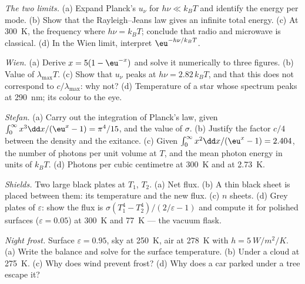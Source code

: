 \begin{exercise}[$\star\star$]\label{exo:b2:thermal-radiation:5}
\emph{The two limits.} (a) Expand Planck's $u_\nu$ for $h\nu \ll k_BT$ and
identify the energy per mode. (b) Show that the Rayleigh--Jeans law
gives an infinite total energy. (c) At \qty{300}{K}, the frequency where
$h\nu = k_BT$; conclude that radio and microwave  is
classical. (d) In the Wien limit, interpret $\eu^{-h\nu/k_BT}$.
\end{exercise}

\begin{exercise}[$\star\star$]\label{exo:b2:thermal-radiation:6}
\emph{Wien.} (a) Derive $x = 5(1 - \eu^{-x})$ and solve it numerically
to three figures. (b) Value of $\lambda_{\max}T$. (c) Show that $u_\nu$
peaks at $h\nu = 2.82\,k_BT$, and that this does not correspond to
$c/\lambda_{\max}$: why not? (d) Temperature of a star whose spectrum
peaks at \qty{290}{nm}; its colour to the eye.
\end{exercise}

\begin{exercise}[$\star\star$]\label{exo:b2:thermal-radiation:7}
\emph{Stefan.} (a) Carry out the integration of Planck's law, given
$\int_0^\infty x^3\dd x/(\eu^x - 1) = \pi^4/15$, and the value of $\sigma$.
(b) Justify the factor $c/4$ between the density and the exitance. (c)
Given $\int_0^\infty x^2\dd x/(\eu^x - 1) = 2.404$, the number of photons
per unit volume at $T$, and the mean photon energy in units of $k_BT$.
(d) Photons per cubic centimetre at \qty{300}{K} and at \qty{2.73}{K}.
\end{exercise}

\begin{exercise}[$\star\star$]\label{exo:b2:thermal-radiation:8}
\emph{Shields.} Two large black plates at $T_1$, $T_2$. (a) Net flux.
(b) A thin black sheet is placed between them: its temperature and the
new flux. (c) $n$ sheets. (d) Grey plates of  $\varepsilon$:
show the flux is $\sigma(T_1^4 - T_2^4)/(2/\varepsilon - 1)$ and compute
it for polished surfaces ($\varepsilon = 0.05$) at \qty{300}{K} and
\qty{77}{K} --- the vacuum flask.
\end{exercise}

\begin{exercise}[$\star\star$]\label{exo:b2:thermal-radiation:9}
\emph{Night frost.} Surface $\varepsilon = 0.95$, sky at \qty{250}{K}, air at
\qty{278}{K} with $h = \qty{5}{W/m^2/K}$. (a) Write the balance and solve
for the surface temperature. (b) Under a cloud at \qty{275}{K}. (c) Why
does wind prevent frost? (d) Why does a car parked under a tree escape
it?
\end{exercise}


